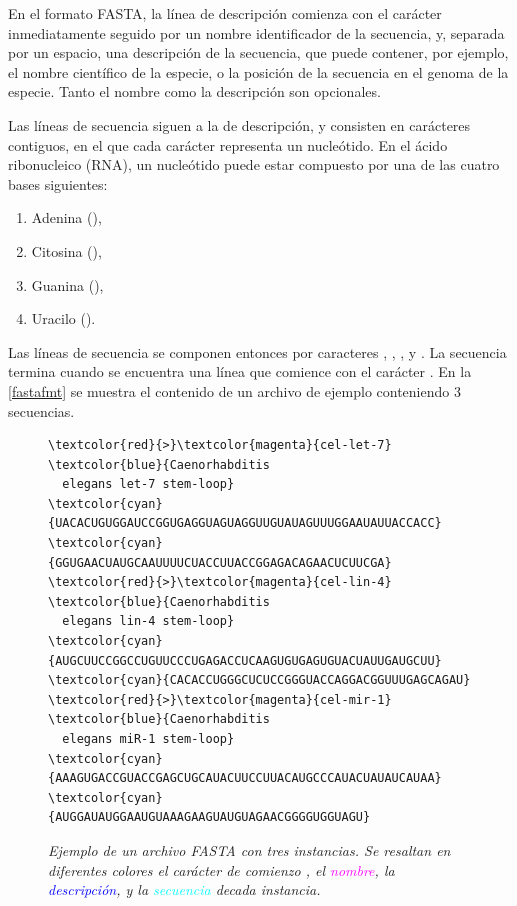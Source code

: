 \documentclass[12pt,bibliography=oldstyle,DIV=12,parskip=half-]{scrreprt}
\begin{document}
En el formato FASTA, la línea de descripción comienza con el carácter
\mono{>} inmediatamente seguido por un nombre identificador de la
secuencia, y, separada por un espacio, una descripción de la
secuencia, que puede contener, por ejemplo, el nombre científico de la
especie, o la posición de la secuencia en el genoma de la especie.
Tanto el nombre como la descripción son opcionales.

Las líneas de secuencia siguen a la de descripción, y consisten en
carácteres contiguos, en el que cada carácter representa un
nucleótido. En el ácido ribonucleico (RNA), un nucleótido puede
estar compuesto por una de las cuatro bases siguientes:
%
\begin{enumerate}
\item Adenina (),
\item Citosina (),
\item Guanina (),
\item Uracilo ().
\end{enumerate}
%
Las líneas de secuencia se componen entonces por caracteres ,
, , y .  La secuencia termina cuando se
encuentra una línea que comience con el carácter \mono{>}.  En la
\autoref{fastafmt} se muestra el contenido de un archivo de ejemplo
conteniendo 3 secuencias.

\begin{figure}
\centering
\begin{Verbatim}[fontsize=\small,frame=single]
\textcolor{red}{>}\textcolor{magenta}{cel-let-7} \textcolor{blue}{Caenorhabditis
  elegans let-7 stem-loop}
\textcolor{cyan}{UACACUGUGGAUCCGGUGAGGUAGUAGGUUGUAUAGUUUGGAAUAUUACCACC}
\textcolor{cyan}{GGUGAACUAUGCAAUUUUCUACCUUACCGGAGACAGAACUCUUCGA}
\textcolor{red}{>}\textcolor{magenta}{cel-lin-4} \textcolor{blue}{Caenorhabditis
  elegans lin-4 stem-loop}
\textcolor{cyan}{AUGCUUCCGGCCUGUUCCCUGAGACCUCAAGUGUGAGUGUACUAUUGAUGCUU}
\textcolor{cyan}{CACACCUGGGCUCUCCGGGUACCAGGACGGUUUGAGCAGAU}
\textcolor{red}{>}\textcolor{magenta}{cel-mir-1} \textcolor{blue}{Caenorhabditis
  elegans miR-1 stem-loop}
\textcolor{cyan}{AAAGUGACCGUACCGAGCUGCAUACUUCCUUACAUGCCCAUACUAUAUCAUAA}
\textcolor{cyan}{AUGGAUAUGGAAUGUAAAGAAGUAUGUAGAACGGGGUGGUAGU}
\end{Verbatim}
\caption{\small\slshape Ejemplo de un archivo FASTA con tres
  instancias. Se resaltan en diferentes colores el carácter de
  comienzo \textcolor{red}{\mono{>}}, el
  \textcolor{magenta}{nombre}, la \textcolor{blue}{descripción}, y
  la \textcolor{cyan}{secuencia} decada instancia.}
\label{fastafmt}
\end{figure}
\end{document}
